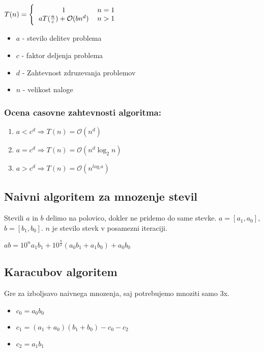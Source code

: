 \documentclass{article}
\begin{document}
\begin{multicols}{2}
	\begin{center}
		\begin{math}
			T(n) =
			\Bigg \{\begin{tabular}{ccc}
				$1$                                    & $n = 1$ & \\
				$a T(\frac{n}{c}) + \mathcal{O}(bn^d)$ & $n > 1$ & \\
			\end{tabular}
		\end{math}
	\end{center}

	\begin{itemize}
		\item $a$ - stevilo delitev problema
		\item $c$ - faktor deljenja problema
		\item $d$ - Zahtevnost zdruzevanja problemov
		\item $n$ - velikost naloge
	\end{itemize}

	\subsubsection{Ocena casovne zahtevnosti algoritma:}
	\begin{enumerate}
		\item $a < c^d \Rightarrow T(n) = \mathcal{O}(n^d)$
		\item $a = c^d \Rightarrow T(n) = \mathcal{O}(n^d \log_2 n)$
		\item $a > c^d \Rightarrow T(n) = \mathcal{O}(n^{log_c a})$
	\end{enumerate}

	\subsection{Naivni algoritem za mnozenje stevil}
	Stevili $a$ in $b$ delimo na polovico, dokler ne pridemo do same stevke.
	$a = [a_1, a_0]$, $b =[b_1, b_0]$. $n$ je stevilo stevk v posamezni iteraciji.

	\begin{center}
		\begin{math}
			ab = 10^n a_1 b_1 + 10^{\frac{n}{2}}(a_0 b_1 + a_1 b_0) + a_0 b_0
		\end{math}
	\end{center}

	\subsection{Karacubov algoritem}
	Gre za izboljsavo naivnega mnozenja, saj potrebujemo mnoziti samo 3x.
	\begin{itemize}
		\item $c_0 = a_0 b_0$
		\item $c_1 = (a_1 + a_0) (b_1 + b_0) - c_0 - c_2$
		\item $c_2 = a_1 b_1$
	\end{itemize}



\end{multicols}
\end{document}
